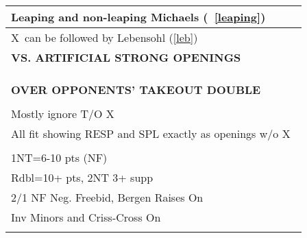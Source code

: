 \documentclass{article}
\newcommand\X{{\footnotesize X}}
\begin{document}
{\begin{minipage}{90mm}
\begin{tabular}{| p{88mm} |}
		\\ \hline
                Leaping and non-leaping Michaels (~\ref{leaping})
		\\ \hline
                \X\ can be followed by Lebensohl (\ref{leb})
		\\ \hline
		\textbf{VS. ARTIFICIAL STRONG OPENINGS} \\ \hline
		\\ \hline
		\\ \hline
		\\ \hline
		\textbf{OVER OPPONENTS' TAKEOUT DOUBLE} \\ \hline
		\\ \hline
                Mostly ignore T/O \X\
		\\ \hline
                All fit showing RESP and SPL
                exactly as openings w/o \X\
		\\ \hline
		\\ \hline
                1NT=6-10 pts (NF)
		\\ \hline
                Rdbl=10+ pts, 2NT 3+ supp
		\\ \hline
                2/1 NF Neg. Freebid, Bergen Raises On
		\\ \hline
                Inv Minors and Criss-Cross On
		\\ \hline
		\\ \hline
	\end{tabular}
\end{minipage}
}
\begin{minipage}{5mm}
	\begin{tabular}{| p{5mm} |}
	\end{tabular}
\end{minipage}
\end{document}
